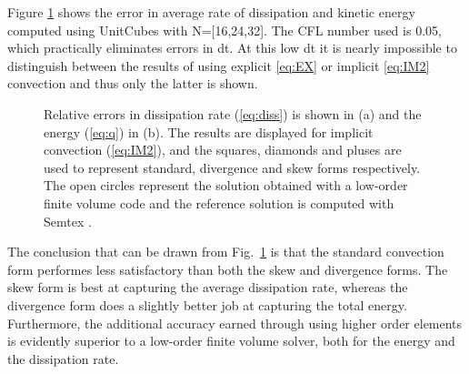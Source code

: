 Figure \ref{fig:dissipation} shows the error in average rate of dissipation and kinetic energy computed using UnitCubes with N=[16,24,32]. The CFL number used is 0.05, which practically eliminates errors in dt. At this low dt it is nearly impossible to distinguish between the results of using explicit \ref{eq:EX} or implicit \ref{eq:IM2} convection and thus only the latter is shown.
\begin{figure}
  \centering
  \caption{Relative errors in dissipation rate (\ref{eq:diss}) is shown in (a) and the energy (\ref{eq:q}) in (b). The results are displayed for implicit convection (\ref{eq:IM2}), and the squares, diamonds and pluses are used to represent standard, divergence and skew forms respectively. The open circles represent the solution obtained with a low-order finite volume code and the reference solution is computed with Semtex \cite{semtex}. }
  \label{fig:dissipation}
\end{figure}
The conclusion that can be drawn from Fig.~\ref{fig:dissipation} is that the standard convection form performes less satisfactory than both the skew and divergence forms. The skew form is best at capturing the average dissipation rate, whereas the divergence form does a slightly better job at capturing the total energy. Furthermore, the additional accuracy earned through using higher order elements is evidently superior to a low-order finite volume solver, both for the energy and the dissipation rate.




